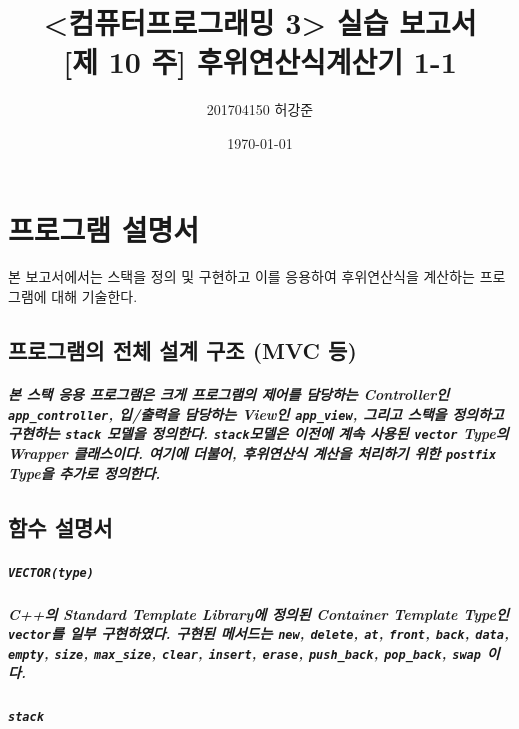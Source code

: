 \documentclass[UTF8]{report}
\title{%
    <컴퓨터프로그래밍 3> 실습 보고서 \\
    \large [제 10 주] 후위연산식계산기 1-1}
\author{201704150 허강준}
\date{\today}
\begin{document}
    \maketitle
    \tableofcontents

    \chapter{프로그램 설명서}
        본 보고서에서는 스택을 정의 및 구현하고 이를 응용하여 후위연산식을 계산하는 프로그램에 대해 기술한다.

        \section{프로그램의 전체 설계 구조 (MVC 등)}

            \paragraph{%
                \normalfont 본 스택 응용 프로그램은 크게 프로그램의 제어를 담당하는 Controller인 \texttt{app\_controller}, 입/출력을 담당하는 View인 \texttt{app\_view}, 그리고 스택을 정의하고 구현하는 \texttt{stack} 모델을 정의한다. \texttt{stack}모델은 이전에 계속 사용된 \texttt{vector} Type의 Wrapper 클래스이다. 여기에 더불어, 후위연산식 계산을 처리하기 위한 \texttt{postfix} Type을 추가로 정의한다.
            }

        \section{함수 설명서}

            \paragraph{\texttt{VECTOR(type)}}
            \paragraph{%
                \normalfont C++의 Standard Template Library에 정의된 Container Template Type인 \texttt{vector}를 일부 구현하였다. 구현된 메서드는 \texttt{new},  \texttt{delete}, \texttt{at}, \texttt{front}, \texttt{back}, \texttt{data}, \texttt{empty}, \texttt{size}, \texttt{max\_size}, \texttt{clear}, \texttt{insert}, \texttt{erase}, \texttt{push\_back}, \texttt{pop\_back}, \texttt{swap} 이다.
            }

            \paragraph{\texttt{stack}}
\end{document}
